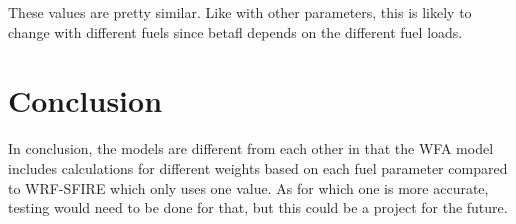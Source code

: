 \documentclass{article}
\begin{document}
These values are pretty similar. Like with other parameters, this is likely to change with different fuels since betafl depends on the different fuel loads. 
\section{Conclusion}

In conclusion, the models are different from each other in that the WFA model includes calculations for different weights based on each fuel parameter compared to WRF-SFIRE which only uses one value. As for which one is more accurate, testing would need to be done for that, but this could be a project for the future. 


\fi
\end{document}
